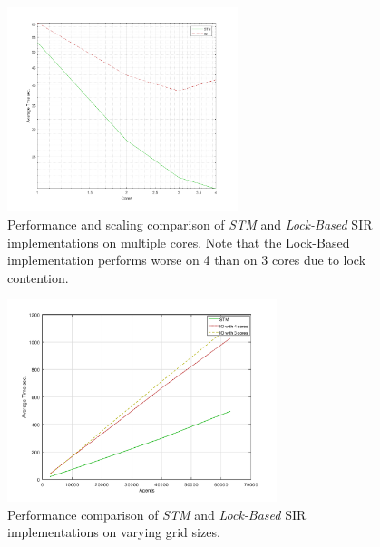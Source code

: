 \documentclass{bmcart}
\begin{document}
\begin{backmatter}
\begin{figure}[h!]
	\includegraphics[width=0.6\textwidth, angle=0]{./sir_core_duration_stm_io.png}
	\caption{Performance and scaling comparison of \textit{STM} and \textit{Lock-Based} SIR implementations on multiple cores. Note that the Lock-Based implementation performs worse on 4 than on 3 cores due to lock contention.}
	\label{fig:core_duration_stm_io}
\end{figure}

\begin{figure}[h!]
	\centering
	\includegraphics[width=0.7\textwidth, angle=0]{./sir_stm_io_varyinggrid_performance.png}
	\caption{Performance comparison of \textit{STM} and \textit{Lock-Based} SIR implementations on varying grid sizes.}
	\label{fig:varyinggrid_constcores}
\end{figure}


\end{backmatter}
\end{document}
